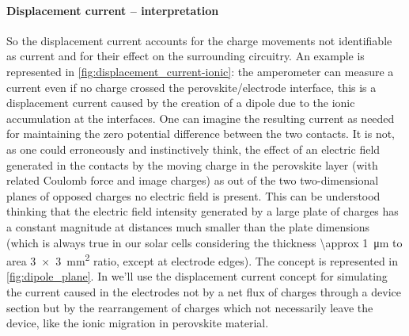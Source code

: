 		\paragraph{Displacement current -- interpretation} So the displacement current accounts for the charge movements not identifiable as current and for their effect on the surrounding circuitry.
		An example is represented in \cref{fig:displacement_current-ionic}: the amperometer can measure a current even if no charge crossed the perovskite/electrode interface, this is a displacement current caused by the creation of a dipole due to the ionic accumulation at the interfaces.
		One can imagine the resulting current as needed for maintaining the zero potential difference between the two contacts.
		It is not, as one could erroneously and instinctively think, the effect of an electric field generated in the contacts by the moving charge in the perovskite layer (with related Coulomb force and image charges) as out of the two two-dimensional planes of opposed charges no electric field is present.
		This can be understood thinking that the electric field intensity generated by a large plate of charges has a constant magnitude at distances much smaller than the plate dimensions (which is always true in our solar cells considering the thickness \SI{\approx 1}{\um} to area \SI{3x3}{\square\mm} ratio, except at electrode edges).
		The concept is represented in \cref{fig:dipole_plane}.
		In  we'll use the displacement current concept for simulating the current caused in the electrodes not by a net flux of charges through a device section but by the rearrangement of charges which not necessarily leave the device, like the ionic migration in perovskite material.

		\begin{figure}
		\end{figure}

